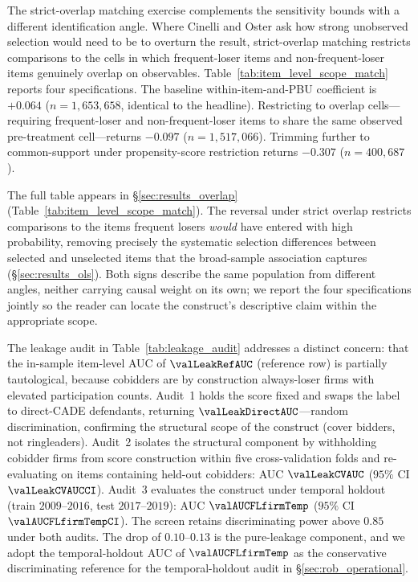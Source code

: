 The strict-overlap matching exercise complements the sensitivity
bounds with a different identification angle. Where Cinelli and
Oster ask how strong unobserved selection would need to be to
overturn the result, strict-overlap matching restricts comparisons
to the cells in which frequent-loser items and non-frequent-loser
items genuinely overlap on observables.
Table~\ref{tab:item_level_scope_match} reports four specifications.
The baseline within-item-and-PBU coefficient is $+0.064$
($n = 1{,}653{,}658$, identical to the headline). Restricting to
overlap cells---requiring frequent-loser and non-frequent-loser
items to share the same observed pre-treatment cell---returns
$-0.097$ ($n = 1{,}517{,}066$). Trimming further to common-support
under propensity-score restriction returns $-0.307$
($n = 400{,}687$).

The full table appears in §\ref{sec:results_overlap}
(Table~\ref{tab:item_level_scope_match}). The reversal under
strict overlap restricts comparisons to the items frequent
losers \emph{would} have entered with high probability,
removing precisely the systematic selection differences between
selected and unselected items that the broad-sample association
captures (§\ref{sec:results_ols}). Both signs describe the same
population from different angles, neither carrying causal weight
on its own; we report the four specifications jointly so the
reader can locate the construct's descriptive claim within the
appropriate scope.

The leakage audit in Table~\ref{tab:leakage_audit} addresses a
distinct concern: that the in-sample item-level AUC of
$\valLeakRefAUC$ (reference row) is partially tautological,
because cobidders are by construction always-loser firms with
elevated participation counts. Audit~1 holds the score fixed
and swaps the label to direct-CADE defendants, returning
$\valLeakDirectAUC$---random discrimination, confirming the
structural scope of the construct (cover bidders, not
ringleaders). Audit~2 isolates the structural component by
withholding cobidder firms from score construction within five
cross-validation folds and re-evaluating on items containing
held-out cobidders: AUC $\valLeakCVAUC$ ($95\%$ CI
$\valLeakCVAUCCI$).
Audit~3 evaluates the construct under temporal holdout (train
$2009$--$2016$, test $2017$--$2019$): AUC $\valAUCFLfirmTemp$
($95\%$ CI $\valAUCFLfirmTempCI$). The screen retains discriminating power above
$0.85$ under both audits. The drop of $0.10$--$0.13$ is the
pure-leakage component, and we adopt the temporal-holdout AUC of
$\valAUCFLfirmTemp$ as the conservative discriminating reference for
the temporal-holdout audit in §\ref{sec:rob_operational}.

